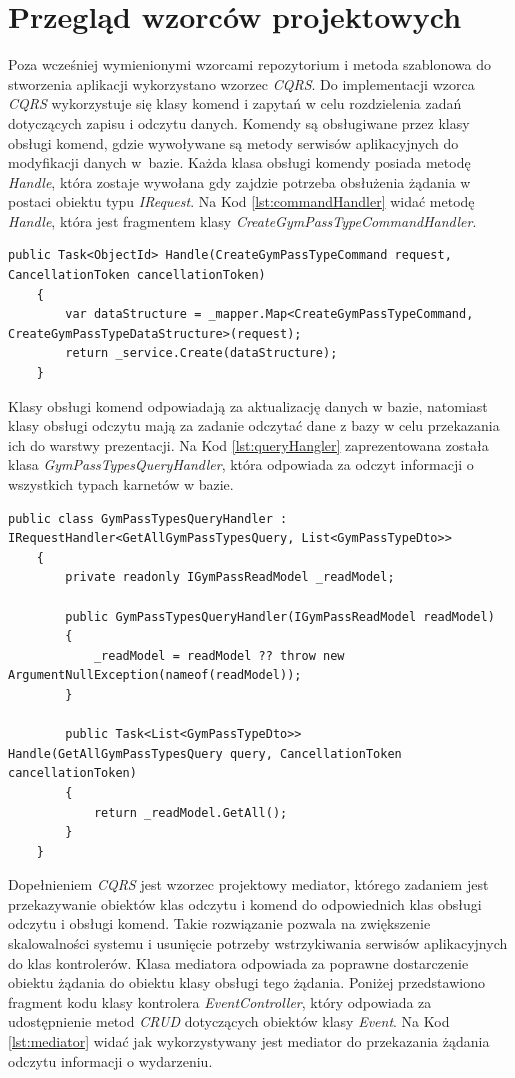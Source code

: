 \documentclass[a4paper,twoside,12pt]{book}
\begin{document}
\section{Przegląd wzorców projektowych}
Poza wcześniej wymienionymi wzorcami repozytorium i metoda szablonowa do stworzenia aplikacji wykorzystano wzorzec \textit{CQRS}. Do implementacji wzorca \textit{CQRS} wykorzystuje się klasy komend i zapytań w celu rozdzielenia zadań dotyczących zapisu i odczytu danych. Komendy są obsługiwane przez klasy obsługi komend, gdzie wywoływane są metody serwisów aplikacyjnych do modyfikacji danych w~bazie. Każda klasa obsługi komendy posiada metodę \textit{Handle}, która zostaje wywołana gdy zajdzie potrzeba obsłużenia żądania w postaci obiektu typu \textit{IRequest}. Na Kod \ref{lst:commandHandler} widać metodę \textit{Handle}, która jest fragmentem klasy \textit{CreateGymPassTypeCommandHandler}.
\begin{lstlisting}[caption={Metoda \textit{Handle} klasy \textit{CreateGymPassTypeCommandHandler}}, label={lst:commandHandler}]
	public Task<ObjectId> Handle(CreateGymPassTypeCommand request, CancellationToken cancellationToken)
	{
		var dataStructure = _mapper.Map<CreateGymPassTypeCommand, CreateGymPassTypeDataStructure>(request);
		return _service.Create(dataStructure);
	}
\end{lstlisting}
Klasy obsługi komend odpowiadają za aktualizację danych w bazie, natomiast klasy obsługi odczytu mają za zadanie odczytać dane z bazy w celu przekazania ich do warstwy prezentacji. Na Kod \ref{lst:queryHangler} zaprezentowana została klasa \textit{GymPassTypesQueryHandler}, która odpowiada za odczyt informacji o wszystkich typach karnetów w bazie.
\begin{lstlisting}[caption={Klasa \textit{GymPassTypesQueryHandler}}, label={lst:queryHangler}]
	public class GymPassTypesQueryHandler : IRequestHandler<GetAllGymPassTypesQuery, List<GymPassTypeDto>>
	{
		private readonly IGymPassReadModel _readModel;
		
		public GymPassTypesQueryHandler(IGymPassReadModel readModel)
		{
			_readModel = readModel ?? throw new ArgumentNullException(nameof(readModel));
		}
		
		public Task<List<GymPassTypeDto>> Handle(GetAllGymPassTypesQuery query, CancellationToken cancellationToken)
		{
			return _readModel.GetAll();
		}
	}
\end{lstlisting}
Dopełnieniem \textit{CQRS} jest wzorzec projektowy mediator, którego zadaniem jest przekazywanie obiektów klas odczytu i komend do odpowiednich klas obsługi odczytu i obsługi komend. Takie rozwiązanie pozwala na zwiększenie skalowalności systemu i usunięcie potrzeby wstrzykiwania serwisów aplikacyjnych do klas kontrolerów. Klasa mediatora odpowiada za poprawne dostarczenie obiektu żądania do obiektu klasy obsługi tego żądania. Poniżej przedstawiono fragment kodu klasy kontrolera \textit{EventController}, który odpowiada za udostępnienie metod \textit{CRUD} dotyczących obiektów klasy \textit{Event}. Na Kod \ref{lst:mediator} widać jak wykorzystywany jest mediator do przekazania żądania odczytu informacji o wydarzeniu.
\end{document}
